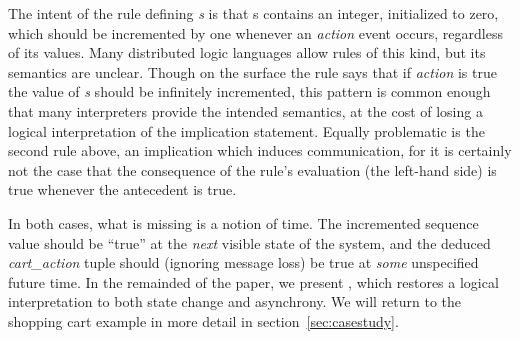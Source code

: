 The intent of the rule defining {\em s} is that s contains an integer, initialized to
zero, which should be incremented by one whenever an {\em action} event occurs,
regardless of its values.  Many distributed logic languages allow rules of this kind,
but its semantics are unclear.  Though on the surface the rule says that if {\em action} is true
the value of {\em s} should be infinitely incremented, this pattern is common enough
that many interpreters provide the intended semantics, at the cost of losing a logical
interpretation of the implication statement.  Equally problematic is the second rule above,
an implication which induces communication, for it is certainly not the case that the consequence of the rule's evaluation (the left-hand side) is true whenever the antecedent is
true.  

In both cases, what is missing is a notion of time.  The incremented sequence value should
be ``true'' at the {\em next} visible state of the system, and the deduced {\em cart\_action}
tuple should (ignoring message loss) be true at {\em some} unspecified future time.
In the remainded of the paper, we present \lang, which restores a logical interpretation to
both state change and asynchrony.  We will return to the shopping cart example in more detail 
in section~\ref{sec:casestudy}.

